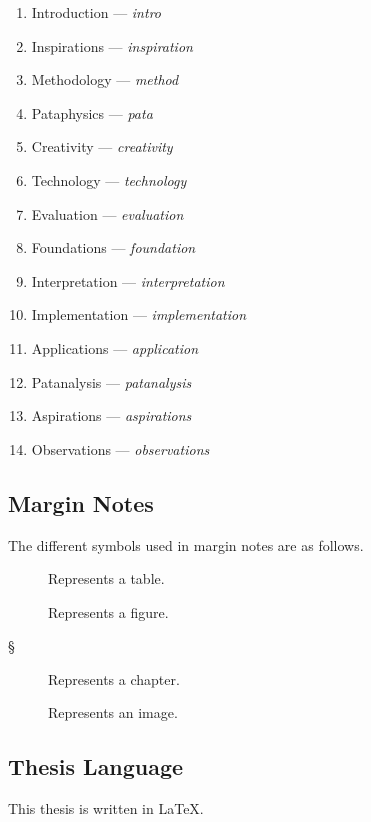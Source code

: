 \begin{enumerate}
  \item Introduction --- \emph{intro}
  \item Inspirations --- \emph{inspiration}
  \item Methodology --- \emph{method}
  \item Pataphysics --- \emph{pata}
  \item Creativity --- \emph{creativity}
  \item Technology --- \emph{technology}
  \item Evaluation --- \emph{evaluation}
  \item Foundations --- \emph{foundation}
  \item Interpretation --- \emph{interpretation}
  \item Implementation --- \emph{implementation}
  \item Applications --- \emph{application}
  \item Patanalysis --- \emph{patanalysis}
  \item Aspirations --- \emph{aspirations}
  \item Observations --- \emph{observations}
\end{enumerate}



\subsection*{Margin Notes}

The different symbols used in margin notes are as follows.

\begin{description}
  \item [] Represents a table.
  \item [] Represents a figure.
  \item [§] Represents a chapter.
  \item [] Represents an image.
\end{description}



\subsection*{Thesis Language}

This thesis is written in \LaTeX.


